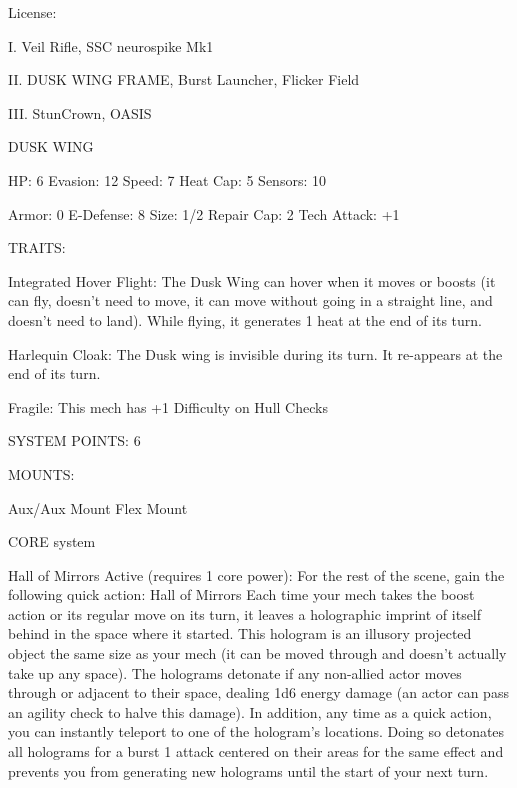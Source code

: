                                                     License:
 
I. Veil Rifle, SSC neurospike Mk1
 
II. DUSK WING FRAME, Burst Launcher, Flicker Field
 
III. StunCrown, OASIS
 

                                                 DUSK WING 

  HP: 6           Evasion: 12                           Speed: 7            Heat Cap: 5        Sensors: 10 

  Armor: 0        E-Defense: 8                          Size: 1/2           Repair Cap: 2      Tech Attack:  
                                                                                               +1 

                                                     TRAITS: 

  Integrated Hover Flight: The Dusk Wing can hover when it moves or boosts (it can fly, doesn’t need to  
  move, it can move without going in a straight line, and doesn’t need to land). While flying, it generates 1  
  heat at the end of its turn.
 
  Harlequin Cloak: The Dusk wing is invisible during its turn. It re-appears at the end of its turn.
 
  Fragile: This mech has +1 Difficulty on Hull Checks 

                                              SYSTEM POINTS: 6 

                                                    MOUNTS: 

  Aux/Aux Mount                      Flex Mount 

                                                  CORE system 

                                                                                                               


                                                  Hall of Mirrors 
  Active (requires 1 core power): For the rest of the scene, gain the following quick action: 
  Hall of Mirrors 
  Each time your mech takes the boost action or its regular move on its turn, it leaves a holographic 
  imprint of itself behind in the space where it started. This hologram is an illusory projected object the 
  same size as your mech (it can be moved through and doesn’t actually take up any space). The 
  holograms detonate if any non-allied actor moves through or adjacent to their space, dealing 1d6 
  energy damage (an actor can pass an agility check to halve this damage). In addition, any time as a 
  quick action, you can instantly teleport to one of the hologram’s locations. Doing so detonates all 
  holograms for a burst 1 attack centered on their areas for the same effect and prevents you from 
  generating new holograms until the start of your next turn. 

